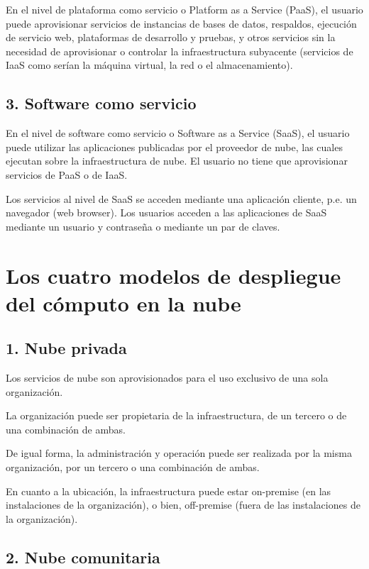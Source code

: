 En el nivel de plataforma como servicio o Platform as a Service (PaaS), el usuario puede aprovisionar servicios de instancias de bases de datos, respaldos, ejecución de servicio web, plataformas de desarrollo y pruebas, y otros servicios sin la necesidad de aprovisionar o controlar la infraestructura subyacente (servicios de IaaS como serían la máquina virtual, la red o el almacenamiento).

\subsection{3. Software como servicio}

En el nivel de software como servicio o Software as a Service (SaaS), el usuario puede utilizar las aplicaciones publicadas por el proveedor de nube, las cuales ejecutan sobre la infraestructura de nube. El usuario no tiene que aprovisionar servicios de PaaS o de IaaS.

Los servicios al nivel de SaaS se acceden mediante una aplicación cliente, p.e. un navegador (web browser). Los usuarios acceden a las aplicaciones de SaaS mediante un usuario y contraseña o mediante un par de claves.

\section{Los cuatro modelos de despliegue del cómputo en la nube}

\subsection{1. Nube privada}

Los servicios de nube son aprovisionados para el uso exclusivo de una sola organización.

La organización puede ser propietaria de la infraestructura, de un tercero o de una combinación de ambas.

De igual forma, la administración y operación puede ser realizada por la misma organización, por un tercero o una combinación de ambas.

En cuanto a la ubicación, la infraestructura puede estar on-premise (en las instalaciones de la organización), o bien, off-premise (fuera de las instalaciones de la organización).

\subsection{2. Nube comunitaria}

